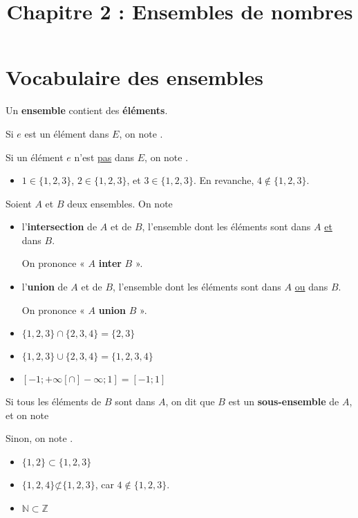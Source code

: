 \documentclass[
	classe=$2^{de}$
]{coursclass}
\title{Chapitre 2 : Ensembles de nombres}
\date{}
\author{}
\begin{document}
\section{Vocabulaire des ensembles}

\begin{definition}
	Un \textbf{ensemble} contient des \textbf{éléments}.

	Si $e$ est un élément dans $E$, on note .

	Si un élément $e$ n'est \uline{pas} dans $E$, on note .
\end{definition}

\begin{exemple}
	\begin{itemize}
		\item $1 ∈ \{1, 2, 3\}$, $2 ∈ \{1, 2, 3\}$, et $3 ∈ \{1, 2, 3\}$. En revanche, $4 ∉ \{1, 2, 3\}$.
	\end{itemize}
\end{exemple}

\begin{definition}
	Soient $A$ et $B$ deux ensembles. On note
	\begin{itemize}
		\item {} l'\textbf{intersection} de $A$ et de $B$, l'ensemble dont les éléments sont dans $A$ \uline{et} dans $B$.

		      On prononce « $A$ \textbf{inter} $B$ ».
		\item {} l'\textbf{union} de $A$ et de $B$, l'ensemble dont les éléments sont dans $A$ \uline{ou} dans $B$.

		      On prononce « $A$ \textbf{union} $B$ ».
	\end{itemize}
\end{definition}

\begin{exemple}
	\begin{itemize}
		\item $\{1, 2, 3\} ∩ \{2, 3, 4\} = \{2, 3\}$
		\item $\{1, 2, 3\} ∪ \{2, 3, 4\} = \{1, 2, 3, 4\}$
		\item $[-1 ; +∞[ ∩ ]-∞ ; 1] = [-1 ; 1]$
	\end{itemize}
\end{exemple}

\begin{definition}
	Si tous les éléments de $B$ sont dans $A$, on dit que $B$ est un \textbf{sous-ensemble} de $A$, et on note 

	Sinon, on note .
\end{definition}

\begin{exemple}
	\begin{itemize}
		\item $\{1, 2\} ⊂ \{1, 2, 3\}$
		\item $\{1, 2, 4\} \not⊂ \{1, 2, 3\}$, car $4 ∉ \{1, 2, 3\}$.
		\item $ℕ ⊂ ℤ$
	\end{itemize}
\end{exemple}
\end{document}
